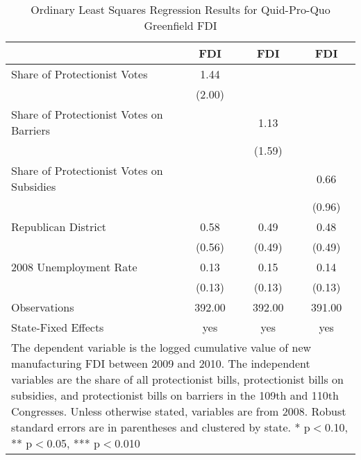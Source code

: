 \begin{table}[htbp]\centering
\def\sym#1{\ifmmode^{#1}\else\(^{#1}\)\fi}
\caption{Ordinary Least Squares Regression Results for Quid-Pro-Quo Greenfield FDI}
\begin{tabular}{l*{3}{c}}
\hline\hline
                    &         FDI   &         FDI   &         FDI   \\
\hline
Share of Protectionist Votes&        1.44   &               &               \\
                    &      (2.00)   &               &               \\
Share of Protectionist Votes on Barriers&               &        1.13   &               \\
                    &               &      (1.59)   &               \\
Share of Protectionist Votes on Subsidies&               &               &        0.66   \\
                    &               &               &      (0.96)   \\
Republican District &        0.58   &        0.49   &        0.48   \\
                    &      (0.56)   &      (0.49)   &      (0.49)   \\
2008 Unemployment Rate&        0.13   &        0.15   &        0.14   \\
                    &      (0.13)   &      (0.13)   &      (0.13)   \\
\hline
Observations        &      392.00   &      392.00   &      391.00   \\
State-Fixed Effects &         yes   &         yes   &         yes   \\
\hline\hline
\multicolumn{4}{l}{\footnotesize The dependent variable is the logged cumulative value of new manufacturing FDI between 2009 and 2010. The independent variables are the share of all protectionist bills, protectionist bills on subsidies, and protectionist bills on barriers in the 109th and 110th Congresses. Unless otherwise stated, variables are from 2008. Robust standard errors are in parentheses and clustered by state. * p$<$0.10, ** p$<$0.05, *** p$<$0.010}\\
\end{tabular}
\end{table}
